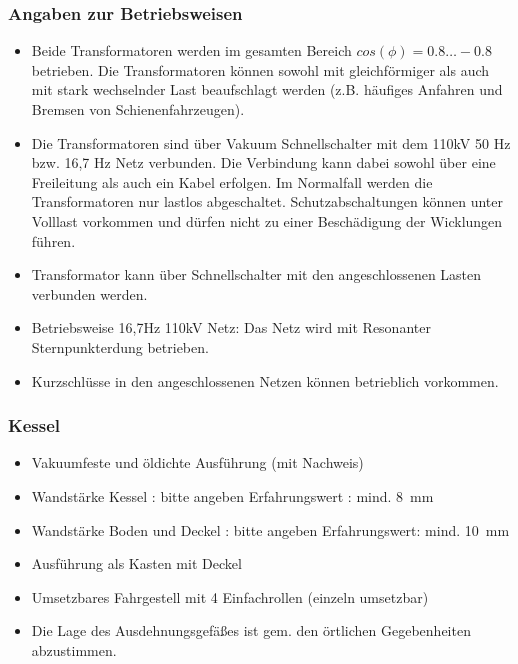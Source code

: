 \subsubsection*{Angaben zur Betriebsweisen}
\begin{itemize}
    \item Beide Transformatoren werden im gesamten Bereich $cos(\phi)=0.8\ldots-0.8$ betrieben. Die Transformatoren können sowohl mit gleichförmiger als auch mit stark wechselnder Last beaufschlagt werden (z.B. häufiges Anfahren und Bremsen von Schienenfahrzeugen).
    \item  Die Transformatoren sind über Vakuum Schnellschalter mit dem 110kV 50 Hz bzw. 16,7 Hz Netz verbunden. Die Verbindung kann dabei sowohl über eine Freileitung als auch ein Kabel erfolgen. 
    Im Normalfall werden die Transformatoren nur lastlos abgeschaltet. Schutzabschaltungen können unter Volllast vorkommen und dürfen nicht zu einer Beschädigung der Wicklungen führen. 
    \item Transformator kann über Schnellschalter mit den angeschlossenen Lasten verbunden werden. 
    \item  Betriebsweise 16,7Hz 110kV Netz: Das Netz wird mit Resonanter Sternpunkterdung betrieben. 
    \item  Kurzschlüsse in den angeschlossenen Netzen können betrieblich vorkommen. 

\end{itemize}

\subsubsection*{Kessel}
\begin{itemize}
    \item Vakuumfeste und öldichte Ausführung (mit Nachweis)
    \item Wandstärke Kessel : bitte angeben	Erfahrungswert : mind. \SI[]{8}[]{\mm}
    \item Wandstärke Boden und Deckel : bitte angeben	Erfahrungswert: mind. \SI[]{10}[]{\mm}
    \item Ausführung als Kasten mit Deckel
    \item Umsetzbares Fahrgestell mit 4 Einfachrollen (einzeln umsetzbar)
    \item Die Lage des Ausdehnungsgefäßes ist gem. den örtlichen Gegebenheiten abzustimmen.
\end{itemize}
